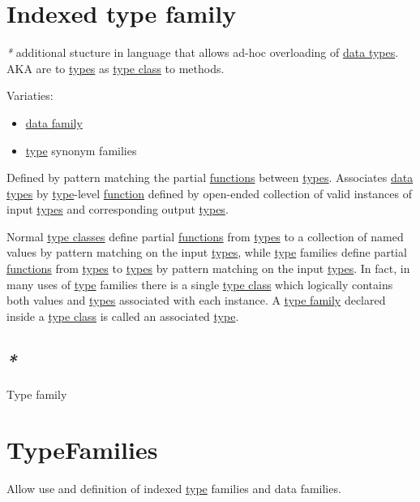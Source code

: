 \documentclass[a4paper,14pt,oneside]{book}
\begin{document}
\chapter{\label{org88e9d6b}Indexed type family}
\label{sec:org3f2dc33}
\emph{*} additional stucture in language that allows ad-hoc overloading of \hyperref[org055bf4c]{data types}. AKA are to \hyperref[org6c15f12]{types} as \hyperref[org903af93]{type class} to methods.

Variaties:
\begin{itemize}
\item \hyperref[org8793404]{data family}
\item \hyperref[orgaa4a18b]{type} synonym families
\end{itemize}

Defined by pattern matching the partial \hyperref[orge13d971]{functions} between \hyperref[org6c15f12]{types}.
Associates \hyperref[org055bf4c]{data types} by \hyperref[orgaa4a18b]{type}-level \hyperref[org6c914bb]{function} defined by open-ended collection of valid instances of input \hyperref[org6c15f12]{types} and corresponding output \hyperref[org6c15f12]{types}.

Normal \hyperref[org6ed66c3]{type classes} define partial \hyperref[orge13d971]{functions} from \hyperref[org6c15f12]{types} to a collection of named values by pattern matching on the input \hyperref[org6c15f12]{types}, while \hyperref[orgaa4a18b]{type} families define partial \hyperref[orge13d971]{functions} from \hyperref[org6c15f12]{types} to \hyperref[org6c15f12]{types} by pattern matching on the input \hyperref[org6c15f12]{types}. In fact, in many uses of \hyperref[orgaa4a18b]{type} families there is a single \hyperref[org903af93]{type class} which logically contains both values and \hyperref[org6c15f12]{types} associated with each instance. A \hyperref[org52a231c]{type family} declared inside a \hyperref[org903af93]{type class} is called an associated \hyperref[orgaa4a18b]{type}.

\section{\emph{*}}
\label{sec:org9de91ea}

\label{org52a231c}Type family

\chapter{\label{org0091e82}TypeFamilies}
\label{sec:orga14bbdb}
Allow use and definition of indexed \hyperref[orgaa4a18b]{type} families and data families.
\end{document}
